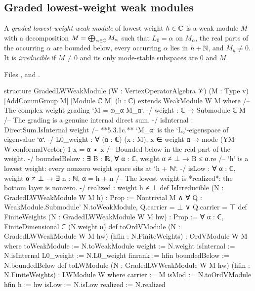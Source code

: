 \subsection{Graded lowest-weight weak modules}

\begin{definition}\label{l13:def:gradedlw}
A \emph{graded lowest-weight weak module} of lowest weight $h\in{\mathbb{C}}$ is a weak module $M$ with a decomposition
$M = \bigoplus_{\alpha\in{\mathbb{C}}}M_\alpha$ such that $L_0 = \alpha$ on $M_\alpha$, the real parts of the occurring $\alpha$ are bounded
below, every occurring $\alpha$ lies in $h+{\mathbb{N}}$, and $M_h\neq0$. It is \emph{irreducible} if $M\neq0$ and its only
mode-stable subspaces are $0$ and $M$.
\end{definition}
\noindent Files ,
 and
.
\begin{leancode}
structure GradedLWWeakModule (W : VertexOperatorAlgebra 𝒱) (M : Type v) [AddCommGroup M]
    [Module ℂ M] (h : ℂ) extends WeakModule W M where
  /-- The complex weight grading `M = ⊕_α M_α`. -/
  weight : ℂ → Submodule ℂ M
  /-- The grading is a genuine internal direct sum. -/
  isInternal : DirectSum.IsInternal weight
  /-- **5.3.1c.** `M_α` is the `L₀`-eigenspace of eigenvalue `α`. -/
  L0_weight : ∀ (α : ℂ) (x : M), x ∈ weight α → mode (YM W.conformalVector) 1 x = α • x
  /-- Bounded below in the real part of the weight. -/
  boundedBelow : ∃ B : ℝ, ∀ α : ℂ, weight α ≠ ⊥ → B ≤ α.re
  /-- `h` is a lowest weight: every nonzero weight space sits at `h + ℕ`. -/
  isLow : ∀ α : ℂ, weight α ≠ ⊥ → ∃ n : ℕ, α = h + n
  /-- The lowest weight is *realized*: the bottom layer is nonzero. -/
  realized : weight h ≠ ⊥
def IsIrreducible (N : GradedLWWeakModule W M h) : Prop :=
  Nontrivial M ∧ ∀ Q : WeakModule.Submodule' N.toWeakModule, Q.carrier = ⊥ ∨ Q.carrier = ⊤
def FiniteWeights (N : GradedLWWeakModule W M hw) : Prop :=
  ∀ α : ℂ, FiniteDimensional ℂ (N.weight α)
def toOrdVModule (N : GradedLWWeakModule W M hw) (hfin : N.FiniteWeights) : OrdVModule W M where
  toWeakModule := N.toWeakModule
  weight := N.weight
  isInternal := N.isInternal
  L0_weight := N.L0_weight
  finrank := hfin
  boundedBelow := N.boundedBelow
def toLWModule (N : GradedLWWeakModule W M hw) (hfin : N.FiniteWeights) : LWModule W where
  carrier := M
  isMod := N.toOrdVModule hfin
  h := hw
  isLow := N.isLow
  realized := N.realized
\end{leancode}

